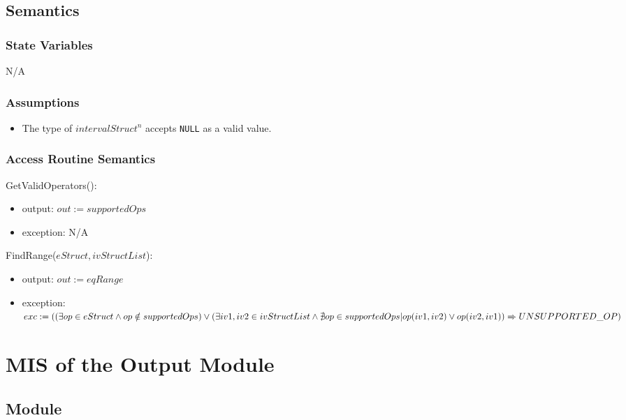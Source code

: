 \documentclass[12pt, titlepage]{article}
\begin{document}
\subsection{Semantics}

\subsubsection{State Variables}

N/A

\subsubsection{Assumptions}

\begin{itemize}
	\item The type of $intervalStruct^n$ accepts \texttt{NULL} as a valid value.
\end{itemize}

\subsubsection{Access Routine Semantics}

\noindent GetValidOperators():
\begin{itemize}
	\item output: $out := supportedOps$
	\item exception: N/A
\end{itemize}

\noindent FindRange($eStruct, ivStructList$):
\begin{itemize}
	\item output: $out := eqRange$
	\item exception: $exc := \\
	((\exists op \in eStruct \wedge op \notin supportedOps) \\
	\vee (\exists iv1, iv2 \in ivStructList \wedge \nexists op \in supportedOps 
	| op(iv1, iv2) \vee op(iv2, iv1)) \\
	\Rightarrow UNSUPPORTED\_OP)$ 
\end{itemize}

\newpage

\section{MIS of the Output Module} 
\label{Module_output}

\subsection{Module}
\end{document}
